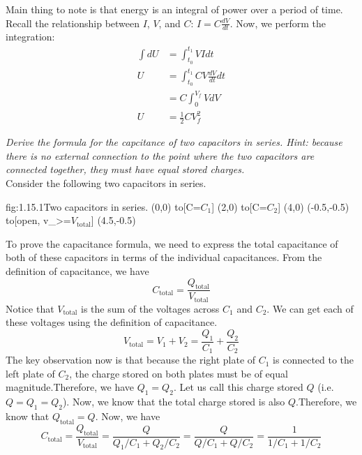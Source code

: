 \documentclass{article}
\begin{document}
    Main thing to note is that energy is an integral of power over a period of time.\\

    Recall the relationship between $I$, $V$, and $C$: $I = C\frac{dV}{dt}$. Now, we perform the integration:
    \begin{align*}
        \int dU &= \int_{t_0} ^{t_1} VIdt\\
        U &= \int_{t_0} ^{t_1} CV\frac{dV}{dt}dt\\
        &= C\int_0^{V_f} V dV\\
        U &= \frac{1}{2}CV_f^2
    \end{align*}

    \textit{Derive the formula for the capcitance of two capacitors in series. Hint: because there is no external connection to the point where the two capacitors are connected together, they must have equal stored charges.}\\

    Consider the following two capacitors in series.
    \begin{circuit}{fig:1.15.1}{Two capacitors in series.}
        (0,0) to[C=$C_1$] (2,0)
            to[C=$C_2$] (4,0)
        (-0.5,-0.5) to[open, v_>=$V_\text{total}$] (4.5,-0.5)
    \end{circuit}
    
    To prove the capacitance formula, we need to express the total capacitance of both of these capacitors in terms of the individual capacitances. From the definition of capacitance, we have 
    \[C_\text{total} = \frac{Q_\text{total}}{V_\text{total}}\]
    Notice that $V_\text{total}$ is the sum of the voltages across $C_1$ and $C_2$. We can get each of these voltages using the definition of capacitance.
    \[V_\text{total} = V_1 + V_2 = \frac{Q_1}{C_1} + \frac{Q_2}{C_2}\]
    The key observation now is that because the right plate of $C_1$ is connected to the left plate of $C_2$, the charge stored on both plates must be of equal magnitude.\footnotemark Therefore, we have $Q_1 = Q_2$. Let us call this charge stored $Q$ (i.e. $Q = Q_1 = Q_2$). Now, we know that the total charge stored is also $Q$.\footnotemark Therefore, we know that $Q_\text{total} = Q$. Now, we have 
    \[C_\text{total} = \frac{Q_\text{total}}{V_\text{total}} = \frac{Q}{Q_1/C_1 + Q_2/C_2} = \frac{Q}{Q/C_1 + Q/C_2} = \frac{1}{1/C_1 + 1/C_2}\]

\end{document}
